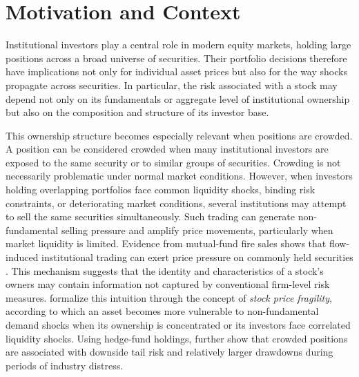 \section{Motivation and Context}
\label{sec:motivation}

Institutional investors play a central role in modern equity markets, holding large positions across a broad universe of securities. Their portfolio decisions therefore have implications not only for individual asset prices but also for the way shocks propagate across securities. In particular, the risk associated with a stock may depend not only on its fundamentals or aggregate level of institutional ownership but also on the composition and structure of its investor base.

This ownership structure becomes especially relevant when positions are crowded. A position can be considered crowded when many institutional investors are exposed to the same security or to similar groups of securities. Crowding is not necessarily problematic under normal market conditions. However, when investors holding overlapping portfolios face common liquidity shocks, binding risk constraints, or deteriorating market conditions, several institutions may attempt to sell the same securities simultaneously. Such trading can generate non-fundamental selling pressure and amplify price movements, particularly when market liquidity is limited. Evidence from mutual-fund fire sales shows that flow-induced institutional trading can exert price pressure on commonly held securities \parencite{coval2007asset}. This mechanism suggests that the identity and characteristics of a stock's owners may contain information not captured by conventional firm-level risk measures. \Textcite{greenwood2011stock} formalize this intuition through the concept of \emph{stock price fragility}, according to which an asset becomes more vulnerable to non-fundamental demand shocks when its ownership is concentrated or its investors face correlated liquidity shocks. Using hedge-fund holdings, \textcite{brown2022crowded} further show that crowded positions are associated with downside tail risk and relatively larger drawdowns during periods of industry distress.

